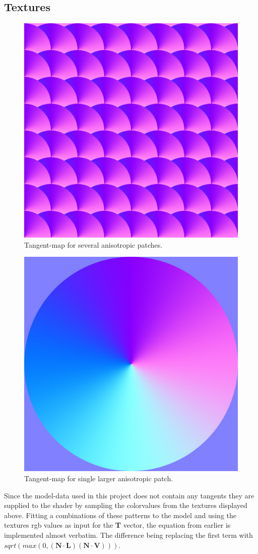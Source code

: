 \documentclass{acmsiggraph}               %
\begin{document}
\subsection{Textures}
\begin{figure}[!ht]
    \centering
    \includegraphics[width=0.5\columnwidth]{aniso_mul.jpg}
    \caption{Tangent-map for several anisotropic patches.}
    \label{figure}
\end{figure}
\begin{figure}[!ht]
    \centering
    \includegraphics[width=0.5\columnwidth]{aniso_sin.jpg}
    \caption{Tangent-map for single larger anisotropic patch.}
    \label{figure}
\end{figure}
Since the model-data used in this project does not contain any tangents they
are supplied to the shader by sampling the colorvalues from the textures displayed
above. Fitting a combinations of these patterns to the model and using the textures rgb values as
input for the \textbf{T} vector, the equation from earlier is implemented
almost verbatim. The difference being replacing the first term with
$sqrt(max(0, (\textbf{N}\cdot\textbf{L})(\textbf{N}\cdot\textbf{V})))$.
\end{document}
